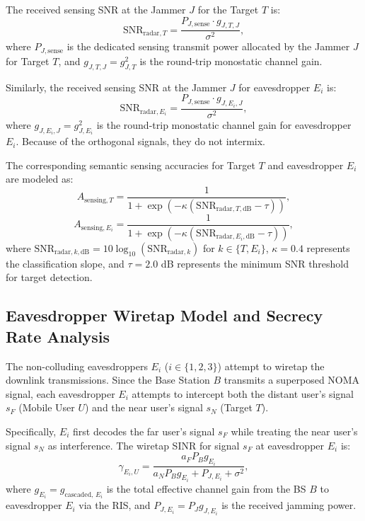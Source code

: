 \documentclass[journal,onecolumn]{IEEEtran}
\begin{document}
The received sensing SNR at the Jammer $J$ for the Target $T$ is:
\begin{equation}
    \text{SNR}_{\text{radar}, T} = \frac{P_{J, \text{sense}} \cdot g_{J, T, J}}{\sigma^2},
\end{equation}
where $P_{J, \text{sense}}$ is the dedicated sensing transmit power allocated by the Jammer $J$ for Target $T$, and $g_{J, T, J} = g_{J, T}^2$ is the round-trip monostatic channel gain.

Similarly, the received sensing SNR at the Jammer $J$ for eavesdropper $E_i$ is:
\begin{equation}
    \text{SNR}_{\text{radar}, E_i} = \frac{P_{J, \text{sense}} \cdot g_{J, E_i, J}}{\sigma^2},
\end{equation}
where $g_{J, E_i, J} = g_{J, E_i}^2$ is the round-trip monostatic channel gain for eavesdropper $E_i$. Because of the orthogonal signals, they do not intermix.

The corresponding semantic sensing accuracies for Target $T$ and eavesdropper $E_i$ are modeled as:
\begin{equation}
    A_{\text{sensing}, T} = \frac{1}{1 + \exp\left( -\kappa (\text{SNR}_{\text{radar}, T, \text{dB}} - \tau) \right)},
\end{equation}
\begin{equation}
    A_{\text{sensing}, E_i} = \frac{1}{1 + \exp\left( -\kappa (\text{SNR}_{\text{radar}, E_i, \text{dB}} - \tau) \right)},
\end{equation}
where $\text{SNR}_{\text{radar}, k, \text{dB}} = 10\log_{10}(\text{SNR}_{\text{radar}, k})$ for $k \in \{T, E_i\}$, $\kappa = 0.4$ represents the classification slope, and $\tau = 2.0$ dB represents the minimum SNR threshold for target detection.

\subsection{Eavesdropper Wiretap Model and Secrecy Rate Analysis}
The non-colluding eavesdroppers $E_i$ ($i \in \{1, 2, 3\}$) attempt to wiretap the downlink transmissions. Since the Base Station $B$ transmits a superposed NOMA signal, each eavesdropper $E_i$ attempts to intercept both the distant user's signal $s_F$ (Mobile User $U$) and the near user's signal $s_N$ (Target $T$). 

Specifically, $E_i$ first decodes the far user's signal $s_F$ while treating the near user's signal $s_N$ as interference. The wiretap SINR for signal $s_F$ at eavesdropper $E_i$ is:
\begin{equation}
    \gamma_{E_i, U} = \frac{a_F P_B g_{E_i}}{a_N P_B g_{E_i} + P_{J, E_i} + \sigma^2},
\end{equation}
where $g_{E_i} = g_{\text{cascaded, } E_i}$ is the total effective channel gain from the BS $B$ to eavesdropper $E_i$ via the RIS, and $P_{J, E_i} = P_J g_{J, E_i}$ is the received jamming power.
\end{document}
